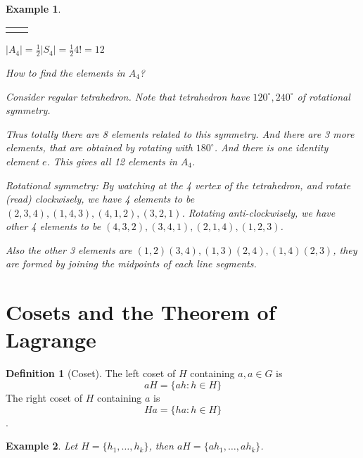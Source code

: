 \documentclass{article}
\theoremstyle{MyNonumberplain}
\theoremstyle{break}
\newcommand{\nline}{\begin{tabular}{ll}&\\\end{tabular}}
\theoremstyle{break}
\newtheorem{example}{Example}[section]
\theoremstyle{break}
\theoremstyle{definition}
\theoremstyle{break}
\newtheorem{definition}{Definition}[section]
\begin{document}
\begin{expbox}
    \begin{example}

        \nline

        $| A_4 | = \frac{1}{2} | S_4 | = \frac{1}{2} 4! = 12$\bigskip

        How to find the elements in $A_4$?\bigskip

        Consider regular tetrahedron. Note that tetrahedron have $120^{\circ}, 240^{\circ}$ of rotational symmetry.\bigskip

        Thus totally there are 8 elements related to this symmetry. And there are 3 more elements, that are obtained by rotating with $180^{\circ}$. And there is one identity element $e$. This gives all 12 elements in $A_4$.\bigskip
        
        Rotational symmetry: By watching at the 4 vertex of the tetrahedron, and
        rotate (read) clockwisely, we have 4 elements to be $(2, 3, 4), (1, 4, 3), (4,
        1, 2), (3, 2, 1)$. Rotating anti-clockwisely, we have other 4 elements to be
        $(4, 3, 2), (3, 4, 1), (2, 1, 4), (1, 2, 3)$.\bigskip

Also the other 3 elements are $(1, 2) (3, 4), (1, 3) (2, 4), (1, 4) (2, 3)$,
they are formed by joining the midpoints of each line segments. 

    \end{example}
\end{expbox}

\newpage

\section{Cosets and the Theorem of Lagrange}

\begin{defbox}
    \begin{definition}[Coset]
        The left coset of $H$ containing $a, a \in G$ is $$a H = \{ a h : h \in H \}$$
        The right coset of $H$ containing $a$ is $$H a = \{ h a : h \in H \}$$.
    \end{definition}
\end{defbox}

\begin{expbox}
    \begin{example}
        Let $H = \{ h_1, \ldots, h_k \}$, then $a H = \{ a h_1, \ldots, a h_k \}$. 
    \end{example}
\end{expbox}
\end{document}
